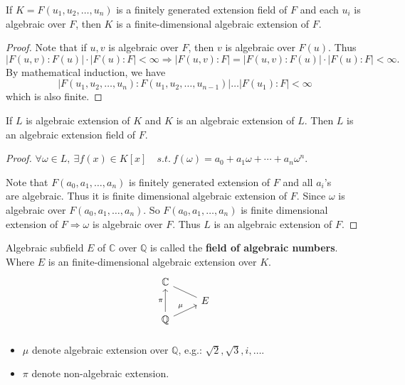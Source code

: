 \begin{theorem}
    If $K = F(u_1, u_2, \ldots, u_n)$ is a finitely generated extension field of 
    $F$ and each $u_i$ is algebraic over $F$, then $K$ is a finite-dimensional algebraic extension of $F$.
\end{theorem}
\begin{proof}
    Note that if $u, v$ is algebraic over $F$, then $v$ is algebraic over $F(u)$. Thus
    \[
        |F(u,v) : F(u)|\cdot |F(u) : F| < \infty \Longrightarrow 
        |F(u,v) : F| = |F(u,v) : F(u)| \cdot |F(u) : F| < \infty.
    \]
    By mathematical induction, we have 
    \[
        |F(u_1, u_2, \ldots, u_n) : F(u_1, u_2, \ldots, u_{n-1})| \ldots 
        |F(u_1) : F| < \infty
    \]
    which is also finite.
\end{proof}

\begin{corollary}
    If $L$ is algebraic extension of $K$ and $K$ is an algebraic extension of $L$. Then 
    $L$ is an algebraic extension field of $F$.
\end{corollary}
\begin{proof}
    $\forall \omega \in L, \> \exists f(x) \in K[x] \quad s.t. \> f(\omega) = a_0 + a_1 \omega 
    + \cdots + a_n \omega^n$. 

    Note that $F(a_0, a_1, \ldots, a_n)$ is finitely generated extension of $F$ and all $a_i$'s
    \\are algebraic. Thus it is finite dimensional algebraic extension of $F$. Since 
    $\omega$ is algebraic over $F(a_0, a_1, \ldots, a_n)$. So $F(a_0, a_1, \ldots, a_n)$ is finite 
    dimensional extension of $F \Longrightarrow \omega$ is algebraic over $F$.
    Thus $L$ is an algebraic extension of $F$.
\end{proof}

\begin{remark}
    Algebraic subfield $E$ of $\mathbb{C}$ over $\mathbb{Q}$ is called the \textbf{field of algebraic numbers}. 
    Where $E$ is an finite-dimensional algebraic extension over $K$.
    \[
        \begin{tikzcd}[row sep=tiny]
            \mathbb{C} &\\
             & E  \arrow[dash]{ul}
            \\
            \mathbb{Q} \arrow[uu, "\pi"] \arrow[ur, "\mu"]&\\
        \end{tikzcd}
    \]

    \begin{itemize}
        \item $\mu$ denote algebraic extension over $\mathbb{Q}$, e.g.: $\sqrt{2}, \sqrt{3}, i, \ldots$.
        \item $\pi$ denote non-algebraic extension.
    \end{itemize}
\end{remark}

